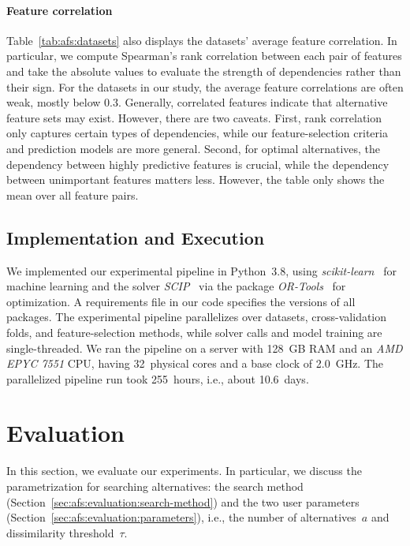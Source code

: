 \documentclass[iicol, sn-basic, Numbered]{sn-jnl} %
\theoremstyle{plain}
\theoremstyle{definition}
\begin{document}
\paragraph{Feature correlation}

Table~\ref{tab:afs:datasets} also displays the datasets' average feature correlation.
In particular, we compute Spearman's rank correlation between each pair of features and take the absolute values to evaluate the strength of dependencies rather than their sign.
For the datasets in our study, the average feature correlations are often weak, mostly below 0.3.
Generally, correlated features indicate that alternative feature sets may exist.
However, there are two caveats.
First, rank correlation only captures certain types of dependencies, while our feature-selection criteria and prediction models are more general.
Second, for optimal alternatives, the dependency between highly predictive features is crucial, while the dependency between unimportant features matters less.
However, the table only shows the mean over all feature pairs.

\subsection{Implementation and Execution}
\label{sec:afs:experimental-design:implementation}

We implemented our experimental pipeline in Python~3.8, using \emph{scikit-learn}~\cite{pedregosa2011scikit-learn} for machine learning and the solver \emph{SCIP}~\cite{bestuzheva2021scip} via the package \emph{OR-Tools}~\cite{perron2022or-tools} for optimization.
A requirements file in our code specifies the versions of all packages.
The experimental pipeline parallelizes over datasets, cross-validation folds, and feature-selection methods, while solver calls and model training are single-threaded.
We ran the pipeline on a server with 128~GB RAM and an \emph{AMD EPYC 7551} CPU, having 32~physical cores and a base clock of 2.0~GHz.
The parallelized pipeline run took 255~hours, i.e., about 10.6~days.

\section{Evaluation}
\label{sec:afs:evaluation}

In this section, we evaluate our experiments.
In particular, we discuss the parametrization for searching alternatives:
the search method (Section~\ref{sec:afs:evaluation:search-method}) and the two user parameters (Section~\ref{sec:afs:evaluation:parameters}), i.e., the number of alternatives~$a$ and dissimilarity threshold~$\tau$.
\end{document}
